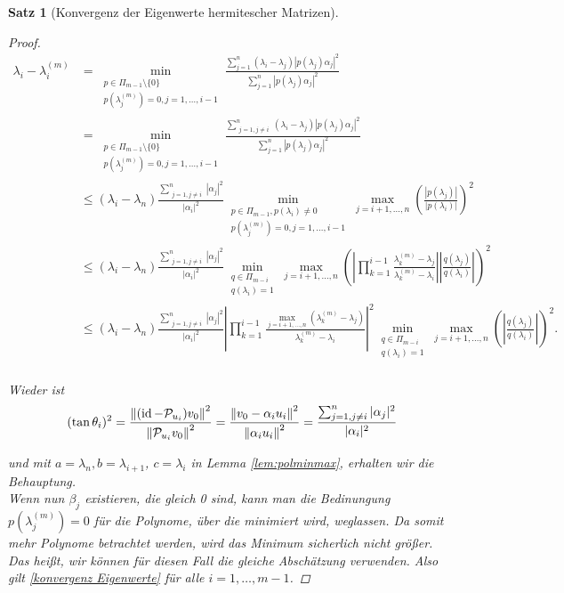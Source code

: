 \documentclass{article}
\theoremstyle{plain}
\newtheorem{theorem}    {Satz}   [section]
\begin{document}
\begin{theorem}[Konvergenz der Eigenwerte hermitescher Matrizen]
\begin{proof}
	\begin{equation*}
		\begin{aligned}
			\lambda_i - \lambda_i^{(m)} &= \min_{\substack{p\in \Pi_{m-1}\setminus \{0\} \\ p(\lambda_j^{(m)}) = 0, j = 1,\dots,i-1}} \frac{\sum_{j=1}^{n} (\lambda_i - \lambda_j)|p(\lambda_j)\alpha_j|^2}{\sum_{j=1}^{n} |p(\lambda_j)\alpha_j|^2} \\
			&= \min_{\substack{p\in \Pi_{m-1}\setminus \{0\} \\ p(\lambda_j^{(m)}) = 0, j = 1,\dots,i-1}} \frac{\sum_{\substack{j=1, j\neq i}}^{n} (\lambda_i - \lambda_j)|p(\lambda_j)\alpha_j|^2}{\sum_{j=1}^{n} |p(\lambda_j)\alpha_j|^2} \\
			& \le (\lambda_i - \lambda_n) \frac{\sum_{\substack{j=1, j\neq i}}^{n} |\alpha_j|^2}{|\alpha_i|^2} \min_{\substack{p\in \Pi_{m-1}, p(\lambda_i) \neq 0 \\ p(\lambda_j^{(m)}) = 0, j = 1,\dots,i-1}} \max_{j=i+1,\dots,n} \left(\frac{|p(\lambda_j)|}{|p(\lambda_i)|}\right)^2 \\
			&\le (\lambda_i - \lambda_n) \frac{\sum_{\substack{j=1, j\neq i}}^{n} |\alpha_j|^2}{|\alpha_i|^2} \min_{\substack{q\in \Pi_{m-i} \\ q(\lambda_i) = 1}} \max_{j=i+1,\dots,n} \left(\left|\prod_{k = 1}^{i-1} \frac{\lambda_k^{(m)} -\lambda_j}{\lambda_k^{(m)} - \lambda_i}\right| \left|\frac{q(\lambda_j)}{q(\lambda_i)}\right|\right)^2 \\
			&\le (\lambda_i - \lambda_n) \frac{\sum_{\substack{j=1, j\neq i}}^{n} |\alpha_j|^2}{|\alpha_i|^2} \left|\prod_{k = 1}^{i-1} \frac{\max_{j=i+1,\dots,n} (\lambda_k^{(m)} -\lambda_j)}{\lambda_k^{(m)} - \lambda_i}\right|^2 \min_{\substack{q\in \Pi_{m-i} \\ q(\lambda_i) = 1}} \max_{j=i+1,\dots,n} \left(\left|\frac{q(\lambda_j)}{q(\lambda_i)}\right|\right)^2. \\
		\end{aligned}
	\end{equation*}

	Wieder ist
	\begin{equation*}
		(\tan\theta_i)^2 = \frac{{\left \| (\operatorname{id} - \mathcal{P}_{u_i})v_0 \right \|}_{}^2}{{\left \|  \mathcal{P}_{u_i}v_0 \right \|}_{}^2} = \frac{{\left \| v_0 - \alpha_i u_i \right \|}_{}^2}{{\left \| \alpha_i u_i \right \|}_{}^2} = \frac{\sum_{\substack{j=1, j\neq i}}^{n} |\alpha_j|^2}{|\alpha_i|^2}
	\end{equation*}

	und  mit $a = \lambda_n, b= \lambda_{i+1}$, $c = \lambda_i$ in Lemma \ref{lem:polminmax}, erhalten wir die Behauptung.\\

	Wenn nun $\beta_j$ existieren, die gleich 0 sind, kann man die Bedinungung $p(\lambda_j^{(m)}) = 0$ für die Polynome, über die minimiert wird, weglassen.
	Da somit mehr Polynome betrachtet werden, wird das Minimum sicherlich nicht größer. Das heißt, wir können für diesen Fall die gleiche Abschätzung verwenden.
	Also gilt \eqref{konvergenz Eigenwerte} für alle $i = 1, \dots, m-1$.
	\end{proof}
\end{theorem}
\end{document}
